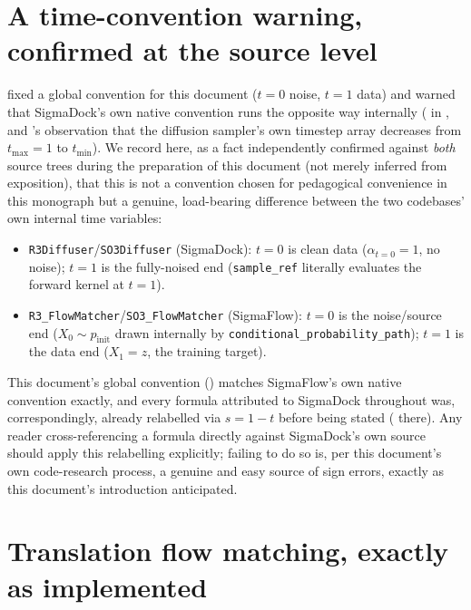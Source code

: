\documentclass[11pt,a4paper]{report}
\theoremstyle{definition}
\theoremstyle{remark}
\newcommand{\pyfunc}[1]{\texttt{#1}}
\begin{document}
\section{A time-convention warning, confirmed at the source level}
\label{sec:sigmaflow-time-convention}

 fixed a global convention for this
document ($t=0$ noise, $t=1$ data) and warned that SigmaDock's own native
convention runs the opposite way internally
( in , and
's observation that the diffusion sampler's
own timestep array decreases from $t_{\max}=1$ to $t_{\min}$). We record
here, as a fact independently confirmed against \emph{both} source trees
during the preparation of this document (not merely inferred from
exposition), that this is not a convention chosen for pedagogical
convenience in this monograph but a genuine, load-bearing difference
between the two codebases' own internal time variables:

\begin{itemize}
\item \pyfunc{R3Diffuser}/\pyfunc{SO3Diffuser} (SigmaDock): $t=0$ is clean
data ($\alpha_{t=0}=1$, no noise); $t=1$ is the fully-noised end
(\pyfunc{sample\_ref} literally evaluates the forward kernel at $t=1$).
\item \pyfunc{R3\_FlowMatcher}/\pyfunc{SO3\_FlowMatcher} (SigmaFlow): $t=0$
is the noise/source end ($X_0\sim p_{\mathrm{init}}$ drawn internally by
\pyfunc{conditional\_probability\_path}); $t=1$ is the data end
($X_1=z$, the training target).
\end{itemize}

This document's global convention ()
matches SigmaFlow's own native convention exactly, and every formula
attributed to SigmaDock throughout  was, correspondingly,
already relabelled via $s=1-t$ before being stated (
there). Any reader cross-referencing a formula directly against SigmaDock's
own source should apply this relabelling explicitly; failing to do so is,
per this document's own code-research process, a genuine and easy source of
sign errors, exactly as this document's introduction anticipated.

\section{Translation flow matching, exactly as implemented}
\label{sec:sigmaflow-translation}
\end{document}
